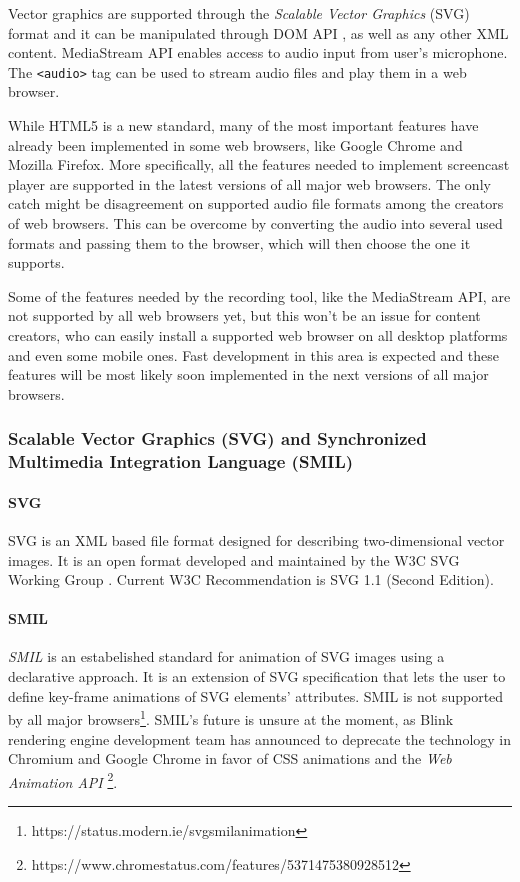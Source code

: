Vector graphics are supported through the \textit{Scalable Vector Graphics} (SVG) format \cite{svg} and it can be manipulated through DOM API \cite{dom}, as well as any other XML content. MediaStream API \cite{} enables access to audio input from user's microphone. The \verb|<audio>| tag can be used to stream audio files and play them in a web browser.

While HTML5 is a new standard, many of the most important features have already been implemented in some web browsers, like Google Chrome and Mozilla Firefox. More specifically, all the features needed to implement screencast player are supported in the latest versions of all major web browsers. The only catch might be disagreement on supported audio file formats among the creators of web browsers. This can be overcome by converting the audio into several used formats and passing them to the browser, which will then choose the one it supports.

Some of the features needed by the recording tool, like the MediaStream API, are not supported by all web browsers yet, but this won't be an issue for content creators, who can easily install a supported web browser on all desktop platforms and even some mobile ones. Fast development in this area is expected and these features will be most likely soon implemented in the next versions of all major browsers.

\subsubsection*{Scalable Vector Graphics (SVG) and Synchronized Multimedia Integration Language (SMIL)}
\paragraph{SVG} SVG is an XML based file format designed for describing two-dimensional vector images\cite{svg}. It is an open format developed and maintained by the W3C SVG Working Group \cite{}. Current W3C Recommendation is SVG 1.1 (Second Edition).

\paragraph{SMIL} \textit{SMIL} is an estabelished standard for animation of SVG images using a declarative approach. It is an extension of SVG specification that lets the user to define key-frame animations of SVG elements' attributes. SMIL is not supported by all major browsers\footnote{https://status.modern.ie/svgsmilanimation}. SMIL's future is unsure at the moment, as Blink rendering engine development team has announced to deprecate the technology in Chromium and Google Chrome in favor of CSS animations and the \textit{Web Animation API} \cite{} \footnote{https://www.chromestatus.com/features/5371475380928512}. 

